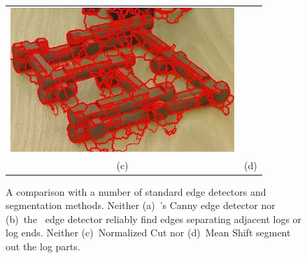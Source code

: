 \begin{figure}
\begin{tabular}{@{}c@{\hspace*{2pt}}c@{}}
\includegraphics[height=0.215\textheight]{images/1263244624-1500-mshift.jpeg}\\
(c)&(d)
\end{tabular}
\vspace*{-4ex}
\caption{\small A comparison with a number of standard edge detectors and segmentation methods.
%
Neither (a)~\Matlab's Canny edge detector nor (b)~the \Pb\ edge detector reliably find edges separating adjacent logs or log ends.
%
Neither (c)~Normalized Cut nor (d)~Mean Shift segment out the log parts.}
%
\label{fig-ll1:comparison}
\end{figure}


